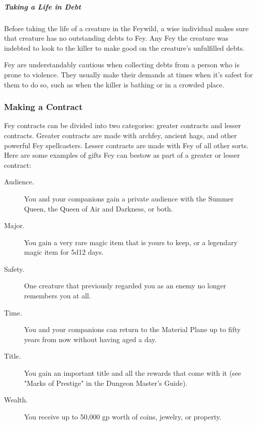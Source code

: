 \documentclass[10pt,a4paper,twoside,bg=print,twocolumn,openany,nodeprecatedcode]{dndbook}
\begin{document}
\subparagraph{Taking a Life in Debt}
Before taking the life of a creature in the Feywild, a wise individual makes sure that creature has no outstanding debts to Fey. Any Fey the creature was indebted to look to the killer to make good on the creature's unfulfilled debts.

Fey are understandably cautious when collecting debts from a person who is prone to violence. They usually make their demands at times when it's safest for them to do so, such as when the killer is bathing or in a crowded place.

\subsubsection{Making a Contract}
Fey contracts can be divided into two categories: greater contracts and lesser contracts. Greater contracts are made with archfey, ancient hags, and other powerful Fey spellcasters. Lesser contracts are made with Fey of all other sorts. Here are some examples of gifts Fey can bestow as part of a greater or lesser contract:

{\par \vspace { 9pt plus 3pt minus 3pt } \noindent  {} \nopagebreak }

\begin{description}
\item[Audience.]
You and your companions gain a private audience with the Summer Queen, the Queen of Air and Darkness, or both.
\item[Major.]
You gain a very rare magic item that is yours to keep, or a legendary magic item for 5d12 days.
\item[Safety.]
One creature that previously regarded you as an enemy no longer remembers you at all.
\item[Time.]
You and your companions can return to the Material Plane up to fifty years from now without having aged a day.
\item[Title.]
You gain an important title and all the rewards that come with it (see "Marks of Prestige" in the Dungeon Master's Guide).
\item[Wealth.]
You receive up to 50,000 gp worth of coins, jewelry, or property.
\end{description}

{\par \vspace { 9pt plus 3pt minus 3pt } \noindent  {} \nopagebreak }
\end{document}
